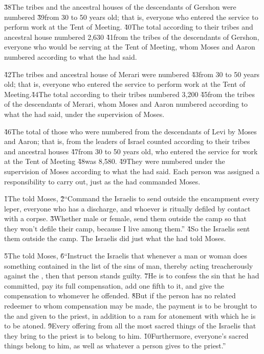 \v{38}The tribes and the ancestral houses of the descendants of Gershon were numbered \v{39}from 30 to 50 years old; that is, everyone who entered the service to perform work at the Tent of Meeting. \v{40}The total according to their tribes and ancestral house numbered 2,630 \v{41}from the tribes of the descendants of Gershon, everyone who would be serving at the Tent of Meeting, whom Moses and Aaron numbered according to what the  had said.

\v{42}The tribes and ancestral house of Merari were numbered \v{43}from 30 to 50 years old; that is, everyone who entered the service to perform work at the Tent of Meeting.\v{44}The total according to their tribes numbered 3,200 \v{45}from the tribes of the descendants of Merari, whom Moses and Aaron numbered according to what the  had said, under the supervision of Moses.

\v{46}The total of those who were numbered from the descendants of Levi by Moses and Aaron; that is, from the leaders of Israel counted according to their tribes and ancestral houses \v{47}from 30 to 50 years old, who entered the service for work at the Tent of Meeting \v{48}was 8,580. \v{49}They were numbered under the supervision of Moses according to what the  had said. Each person was assigned a responsibility to carry out, just as the  had commanded Moses.

\v{1}The  told Moses, \v{2}``Command the Israelis to send outside the encampment every leper, everyone who has a discharge, and whoever is ritually defiled by contact with a corpse. \v{3}Whether male or female, send them outside the camp so that they won't defile their camp, because I live among them.'' \v{4}So the Israelis sent them outside the camp. The Israelis did just what the  had told Moses.

\v{5}The  told Moses, \v{6}``Instruct the Israelis that whenever a man or woman does something contained in the list of the sins of man, thereby acting treacherously against the , then that person stands guilty. \v{7}He is to confess the sin that he had committed, pay its full compensation, add one fifth to it, and give the compensation to whomever he offended. \v{8}But if the person has no related redeemer to whom compensation may be made, the payment is to be brought to the  and given to the priest, in addition to a ram for atonement with which he is to be atoned. \v{9}Every offering from all the most sacred things of the Israelis that they bring to the priest is to belong to him. \v{10}Furthermore, everyone's sacred things belong to him, as well as whatever a person gives to the priest.''


